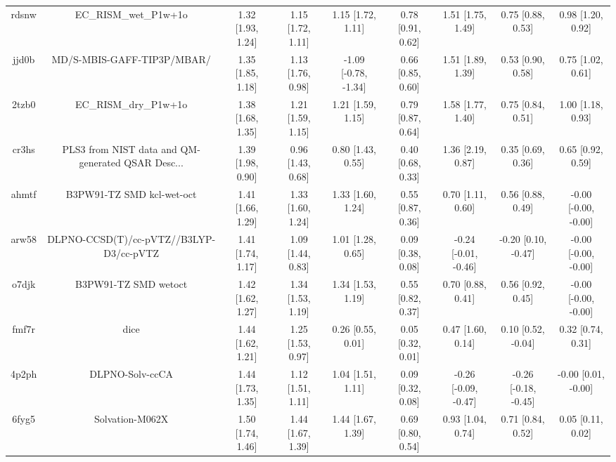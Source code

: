 \documentclass{article}
\begin{document}
\begin{center}
\begin{longtable}{|ccccccccc|}
 rdsnw &                              EC\_RISM\_wet\_P1w+1o &  1.32 [1.93, 1.24] &  1.15 [1.72, 1.11] &     1.15 [1.72, 1.11] &  0.78 [0.91, 0.62] &     1.51 [1.75, 1.49] &     0.75 [0.88, 0.53] &     0.98 [1.20, 0.92] \\
 jjd0b &                         MD/S-MBIS-GAFF-TIP3P/MBAR/ &  1.35 [1.85, 1.18] &  1.13 [1.76, 0.98] &  -1.09 [-0.78, -1.34] &  0.66 [0.85, 0.60] &     1.51 [1.89, 1.39] &     0.53 [0.90, 0.58] &     0.75 [1.02, 0.61] \\
 2tzb0 &                              EC\_RISM\_dry\_P1w+1o &  1.38 [1.68, 1.35] &  1.21 [1.59, 1.15] &     1.21 [1.59, 1.15] &  0.79 [0.87, 0.64] &     1.58 [1.77, 1.40] &     0.75 [0.84, 0.51] &     1.00 [1.18, 0.93] \\
 cr3hs &  PLS3 from NIST data and QM-generated QSAR Desc... &  1.39 [1.98, 0.90] &  0.96 [1.43, 0.68] &     0.80 [1.43, 0.55] &  0.40 [0.68, 0.33] &     1.36 [2.19, 0.87] &     0.35 [0.69, 0.36] &     0.65 [0.92, 0.59] \\
 ahmtf &                          B3PW91-TZ SMD kcl-wet-oct &  1.41 [1.66, 1.29] &  1.33 [1.60, 1.24] &     1.33 [1.60, 1.24] &  0.55 [0.87, 0.36] &     0.70 [1.11, 0.60] &     0.56 [0.88, 0.49] &  -0.00 [-0.00, -0.00] \\
 arw58 &            DLPNO-CCSD(T)/cc-pVTZ//B3LYP-D3/cc-pVTZ &  1.41 [1.74, 1.17] &  1.09 [1.44, 0.83] &     1.01 [1.28, 0.65] &  0.09 [0.38, 0.08] &  -0.24 [-0.01, -0.46] &   -0.20 [0.10, -0.47] &  -0.00 [-0.00, -0.00] \\
 o7djk &                               B3PW91-TZ SMD wetoct &  1.42 [1.62, 1.27] &  1.34 [1.53, 1.19] &     1.34 [1.53, 1.19] &  0.55 [0.82, 0.37] &     0.70 [0.88, 0.41] &     0.56 [0.92, 0.45] &  -0.00 [-0.00, -0.00] \\
 fmf7r &                                               dice &  1.44 [1.62, 1.21] &  1.25 [1.53, 0.97] &     0.26 [0.55, 0.01] &  0.05 [0.32, 0.01] &     0.47 [1.60, 0.14] &    0.10 [0.52, -0.04] &     0.32 [0.74, 0.31] \\
 4p2ph &                                    DLPNO-Solv-ccCA &  1.44 [1.73, 1.35] &  1.12 [1.51, 1.11] &     1.04 [1.51, 1.11] &  0.09 [0.32, 0.08] &  -0.26 [-0.09, -0.47] &  -0.26 [-0.18, -0.45] &   -0.00 [0.01, -0.00] \\
 6fyg5 &                                    Solvation-M062X &  1.50 [1.74, 1.46] &  1.44 [1.67, 1.39] &     1.44 [1.67, 1.39] &  0.69 [0.80, 0.54] &     0.93 [1.04, 0.74] &     0.71 [0.84, 0.52] &     0.05 [0.11, 0.02] \\

\end{longtable}
\end{center}
\end{document}
